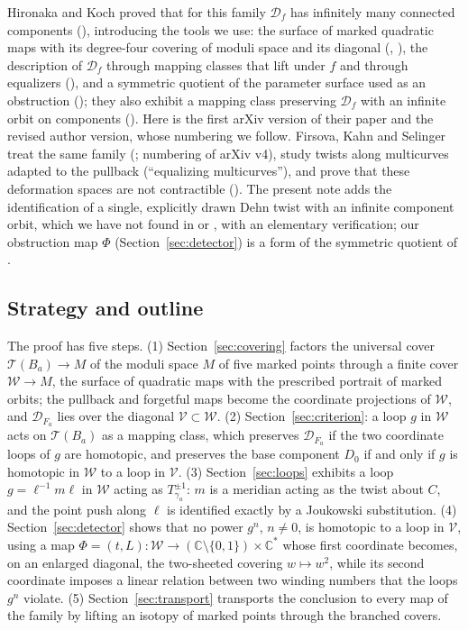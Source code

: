 \documentclass[11pt]{article}
\newcommand{\C}{\mathbb C}
\newcommand{\Teich}{\mathcal T}
\newcommand{\D}{\mathcal D}
\newcommand{\W}{\mathcal W}
\newcommand{\V}{\mathcal V}
\theoremstyle{remark}
\numberwithin{equation}{section}
\begin{document}
Hironaka and Koch \cite{HK} proved that for this family $\D_f$ has
infinitely many connected components (\cite[Thm.\ 1.4]{HK}), introducing
the tools we use: the surface of marked quadratic maps with its
degree-four covering of moduli space and its diagonal
(\cite[\S\S4.1--4.2]{HKa}, \cite[\S3]{HK}), the description of $\D_f$
through mapping classes that lift under $f$ and through equalizers
(\cite[\S\S2.8--2.11]{HK}), and a symmetric quotient of the parameter
surface used as an obstruction (\cite[\S2.12]{HK}); they also exhibit a
mapping class preserving $\D_f$ with an infinite orbit on components
(\cite[Prop.\ 3.2]{HK}). Here \cite{HKa} is the first arXiv version of
their paper and \cite{HK} the revised author version, whose numbering we
follow. Firsova, Kahn and Selinger \cite{FKS} treat the same family
(\cite[\S6]{FKS}; numbering of arXiv v4), study twists along multicurves
adapted to the pullback (``equalizing multicurves''), and prove that these
deformation spaces are not contractible (\cite[Lemma 8.4]{FKS}). The
present note adds the identification of a single, explicitly drawn Dehn
twist with an infinite component orbit, which we have not found in
\cite{HK} or \cite{FKS}, with an elementary verification; our obstruction
map $\Phi$ (Section~\ref{sec:detector}) is a form of the symmetric
quotient of \cite{HK}.

\subsection{Strategy and outline}\label{sec:strategy}

The proof has five steps. (1) Section~\ref{sec:covering} factors the
universal cover $\Teich(B_a)\to M$ of the moduli space $M$ of five marked
points through a finite cover $\W\to M$, the surface of quadratic maps with
the prescribed portrait of marked orbits; the pullback and forgetful maps
become the coordinate projections of $\W$, and $\D_{F_a}$ lies over the
diagonal $\V\subset\W$. (2) Section~\ref{sec:criterion}: a loop $g$ in
$\W$ acts on $\Teich(B_a)$ as a mapping class, which preserves $\D_{F_a}$
if the two coordinate loops of $g$ are homotopic, and preserves the base
component $D_0$ if and only if $g$ is homotopic in $\W$ to a loop in $\V$.
(3) Section~\ref{sec:loops} exhibits a loop $g=\ell^{-1}m\ell$ in $\W$
acting as $T_{\gamma_a}^{\pm1}$: $m$ is a meridian acting as the twist
about $C$, and the point push along $\ell$ is identified exactly by a
Joukowski substitution. (4) Section~\ref{sec:detector} shows that no power
$g^n$, $n\ne0$, is homotopic to a loop in $\V$, using a map
$\Phi=(t,L)\colon\W\to(\C\setminus\{0,1\})\times\C^*$ whose first
coordinate becomes, on an enlarged diagonal, the two-sheeted covering
$w\mapsto w^2$, while its second coordinate imposes a linear relation
between two winding numbers that the loops $g^n$ violate. (5)
Section~\ref{sec:transport} transports the conclusion to every map of the
family by lifting an isotopy of marked points through the branched covers.
\end{document}
